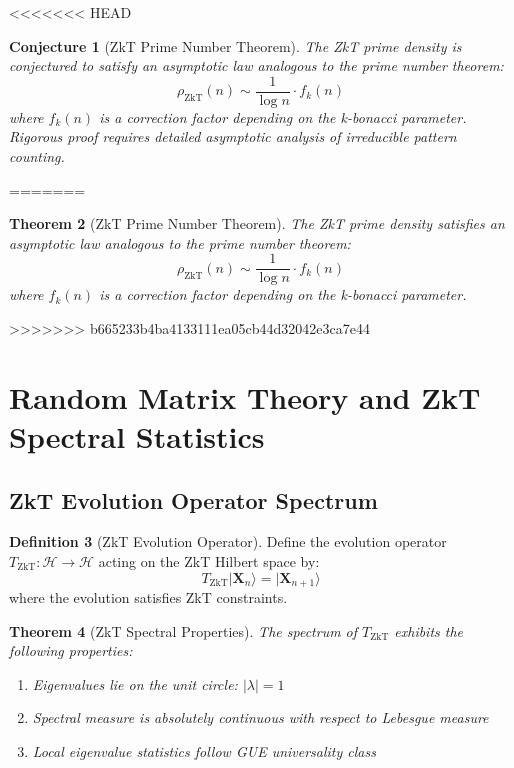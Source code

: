 \documentclass[12pt]{article}
\theoremstyle{plain}
\newtheorem{theorem}{Theorem}[section]
\newtheorem{conjecture}[theorem]{Conjecture}
\theoremstyle{definition}
\newtheorem{definition}[theorem]{Definition}
\newcommand{\cH}{\mathcal{H}}
\begin{document}
<<<<<<< HEAD
\begin{conjecture}[ZkT Prime Number Theorem]
The ZkT prime density is conjectured to satisfy an asymptotic law analogous to the prime number theorem:
\begin{equation}
\rho_{\text{ZkT}}(n) \sim \frac{1}{\log n} \cdot f_k(n)
\end{equation}
where $f_k(n)$ is a correction factor depending on the k-bonacci parameter. Rigorous proof requires detailed asymptotic analysis of irreducible pattern counting.
\end{conjecture}
=======
\begin{theorem}[ZkT Prime Number Theorem]
The ZkT prime density satisfies an asymptotic law analogous to the prime number theorem:
\begin{equation}
\rho_{\text{ZkT}}(n) \sim \frac{1}{\log n} \cdot f_k(n)
\end{equation}
where $f_k(n)$ is a correction factor depending on the k-bonacci parameter.
\end{theorem}
>>>>>>> b665233b4ba4133111ea05cb44d32042e3ca7e44

\section{Random Matrix Theory and ZkT Spectral Statistics}

\subsection{ZkT Evolution Operator Spectrum}

\begin{definition}[ZkT Evolution Operator]
Define the evolution operator $T_{\text{ZkT}}: \cH \to \cH$ acting on the ZkT Hilbert space by:
\begin{equation}
T_{\text{ZkT}} |\mathbf{X}_n\rangle = |\mathbf{X}_{n+1}\rangle
\end{equation}
where the evolution satisfies ZkT constraints.
\end{definition}

\begin{theorem}[ZkT Spectral Properties]
The spectrum of $T_{\text{ZkT}}$ exhibits the following properties:
\begin{enumerate}
\item Eigenvalues lie on the unit circle: $|\lambda| = 1$
\item Spectral measure is absolutely continuous with respect to Lebesgue measure
\item Local eigenvalue statistics follow GUE universality class
\end{enumerate}
\end{theorem}
\end{document}
